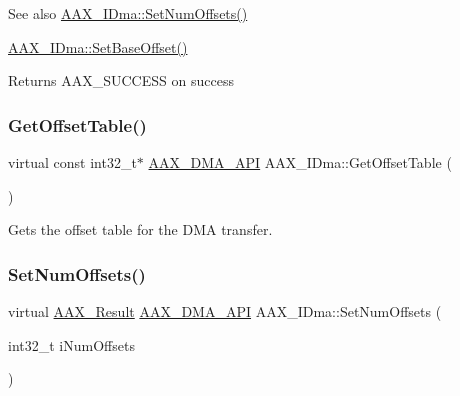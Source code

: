 \begin{DoxySeeAlso}{See also}
\mbox{\hyperlink{a01809_a58f2933fda57ac6a1cdf20cce96aceac}{A\+A\+X\+\_\+\+I\+Dma\+::\+Set\+Num\+Offsets()}} 

\mbox{\hyperlink{a01809_ac3a22df0462c7f4888a429b3eadae4dd}{A\+A\+X\+\_\+\+I\+Dma\+::\+Set\+Base\+Offset()}}
\end{DoxySeeAlso}
\begin{DoxyReturn}{Returns}
{\ttfamily A\+A\+X\+\_\+\+S\+U\+C\+C\+E\+SS} on success 
\end{DoxyReturn}
\mbox{\label{a01809_ab00bbebfffe925b8332eade3457d706e}} 
\subsubsection{\texorpdfstring{GetOffsetTable()}{GetOffsetTable()}}
{\footnotesize\ttfamily virtual const int32\+\_\+t$\ast$ \mbox{\hyperlink{a00587_acae60d01e5e4bd3282369d0d9d378f3f}{A\+A\+X\+\_\+\+D\+M\+A\+\_\+\+A\+PI}} A\+A\+X\+\_\+\+I\+Dma\+::\+Get\+Offset\+Table (\begin{DoxyParamCaption}{ }\end{DoxyParamCaption})\hspace{0.3cm}{\ttfamily [pure virtual]}}



Gets the offset table for the D\+MA transfer. 

\mbox{\label{a01809_a58f2933fda57ac6a1cdf20cce96aceac}} 
\subsubsection{\texorpdfstring{SetNumOffsets()}{SetNumOffsets()}}
{\footnotesize\ttfamily virtual \mbox{\hyperlink{a00392_a4d8f69a697df7f70c3a8e9b8ee130d2f}{A\+A\+X\+\_\+\+Result}} \mbox{\hyperlink{a00587_acae60d01e5e4bd3282369d0d9d378f3f}{A\+A\+X\+\_\+\+D\+M\+A\+\_\+\+A\+PI}} A\+A\+X\+\_\+\+I\+Dma\+::\+Set\+Num\+Offsets (\begin{DoxyParamCaption}\item[{int32\+\_\+t}]{i\+Num\+Offsets }\end{DoxyParamCaption})\hspace{0.3cm}{\ttfamily [pure virtual]}}



